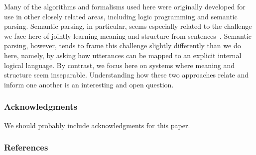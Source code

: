 \documentclass{article} %
\begin{document}
Many of the algorithms and formalisms used here were originally
developed for use in other closely related areas, including logic
programming and semantic parsing. Semantic parsing, in particular,
seems especially related to the challenge we face here of jointly
learning meaning and structure from
sentences~\cite{berant2013semantic, liang2013learning, kwiatkowski2010inducing, poon2009unsupervised}. Semantic parsing,
however, tends to frame this challenge slightly differently than we do
here, namely, by asking how utterances can be mapped to an explicit
internal logical language. By contrast, we focus here on systems where
meaning and structure seem inseparable. Understanding how these two
approaches relate and inform one another is an interesting and open
question.

\subsubsection*{Acknowledgments}

We should probably include acknowledgments for this paper.

\subsubsection*{References}



\end{document}
